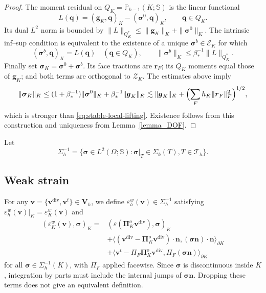 \documentclass[review,hidelinks,onefignum,onetabnum]{siamart251216}
\begin{document}
\begin{proof}
The moment residual on $Q_K=\mathbb P_{k-1}(K;\mathbb S)$ is the
linear functional
\[
 L(\boldsymbol q)=(\boldsymbol g_K,\boldsymbol q)_K
 -(\boldsymbol\sigma^0,\boldsymbol q)_K,
 \qquad \boldsymbol q\in Q_K.
\]
Its dual $L^2$ norm is bounded by
$\|L\|_{Q_K^*}\le\|\boldsymbol g_K\|_K+
\|\boldsymbol\sigma^0\|_K$.
The intrinsic inf--sup condition is equivalent to the existence of a
unique $\boldsymbol\sigma^b\in\mathcal E_K$ for which
\[
 (\boldsymbol\sigma^b,\boldsymbol q)_K=L(\boldsymbol q)
 \quad(\boldsymbol q\in Q_K),\qquad
 \|\boldsymbol\sigma^b\|_K\le\beta_*^{-1}\|L\|_{Q_K^*}.
\]
Finally set $\boldsymbol\sigma_K=\boldsymbol\sigma^0+
\boldsymbol\sigma^b$. Its face tractions are $\boldsymbol r_F$;
its $Q_K$ moments equal those of $\boldsymbol g_K$; and both terms
are orthogonal to $\mathcal Z_K$. The estimates above imply
\[
 \|\boldsymbol\sigma_K\|_K
 \le (1+\beta_*^{-1})\|\boldsymbol\sigma^0\|_K
 +\beta_*^{-1}\|\boldsymbol g_K\|_K
 \lesssim \|\boldsymbol g_K\|_K+
 \Bigl(\sum_F h_K\|\boldsymbol r_F\|_F^2\Bigr)^{1/2},
\]
which is stronger than \eqref{eq:stable-local-lifting}.
Existence follows from this construction and uniqueness from
Lemma~\ref{lemma_DOF}.
\end{proof}

Let
\[
\Sigma_h^{-1} = \{\boldsymbol{\sigma} \in L^2(\Omega;\mathbb{S}) : \boldsymbol{\sigma}|_T \in \Sigma_k(T), T \in \mathcal{T}_h\}.
\]

\subsection{Weak strain}
For any \(\boldsymbol{v} = \{ \boldsymbol{v}^{\operatorname{div}}, \boldsymbol{v}^t \} \in \boldsymbol{V}_h\),
we define \(\varepsilon^w_h(\boldsymbol{v}) \in \Sigma_h^{-1}\) satisfying \( \varepsilon^w_h(\boldsymbol{v})|_K=\varepsilon_K^w(\boldsymbol{v})\) and
\begin{equation}\label{equ:weakstrain1}
\begin{aligned}
(\varepsilon_K^w(\boldsymbol v),\boldsymbol\sigma)_K
={}&(\varepsilon(\boldsymbol\Pi_K^o\boldsymbol v^{\operatorname{div}}),\boldsymbol\sigma)_K\\
&+\langle(\boldsymbol v^{\operatorname{div}}-
 \boldsymbol\Pi_K^o\boldsymbol v^{\operatorname{div}})\cdot\boldsymbol n,
 (\boldsymbol\sigma\boldsymbol n)\cdot\boldsymbol n\rangle_{\partial K}\\
&+\langle\boldsymbol v^t-\Pi_F\boldsymbol\Pi_K^o\boldsymbol v^{\operatorname{div}},
 \Pi_F(\boldsymbol\sigma\boldsymbol n)\rangle_{\partial K}
\end{aligned}
\end{equation}
for all $\boldsymbol\sigma\in\Sigma_h^{-1}(K)$, with $\Pi_F$ applied facewise.
Since $\boldsymbol\sigma$ is discontinuous inside $K$, integration by
parts must include the internal jumps of $\boldsymbol\sigma\boldsymbol n$.
Dropping these terms does not give an equivalent definition.
\end{document}

